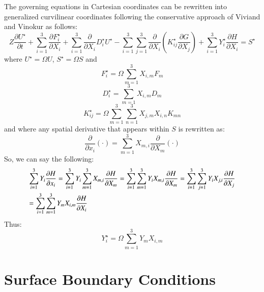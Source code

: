 \documentclass{warpdoc}
\newcommand{\alb}{\vspace{0.1cm}\\} %
\newcommand{\mfd}{\displaystyle}
\begin{document}
The governing equations in Cartesian coordinates can be rewritten into generalized curvilinear coordinates following the conservative approach of Viviand \cite{misc:1974:viviand} and Vinokur \cite{jcp:1974:vinokur} as follows:
%
\begin{equation}
   Z\frac{\partial U^\star}{\partial t} + \sum_{i=1}^3 \frac{\partial F_i^\star}{\partial X_i} 
     + \sum_{i=1}^3 \frac{\partial }{\partial X_i} D_i^\star U^\star
     - \sum_{i=1}^3 \sum_{j=1}^3 \frac{\partial }{\partial X_i}\left( K_{ij}^\star \frac{\partial G}{\partial X_j} \right)
     +\sum_{i=1}^3 Y_i^\star \frac{\partial H}{\partial X_i}  
=
S^\star
\end{equation}
%
where  $U^\star=\Omega U$, $S^\star=\Omega S$ and
%
\begin{equation}
 F_i^\star=\Omega \sum_{m=1}^3 X_{i,m} F_m
\end{equation}
%
%
\begin{equation}
 D_i^\star= \sum_{m=1}^3 X_{i,m} D_m
\end{equation}
%
%
\begin{equation}
 K_{ij}^\star=\Omega \sum_{m=1}^3 \sum_{n=1}^3 X_{j,m} X_{i,n} K_{mn}
\end{equation}
%
and where any spatial derivative that appears within $S$ is rewritten as:
%
\begin{equation}
 \frac{\partial}{\partial x_i}\left( \cdot \right) = \sum_{m=1}^3 X_{m,i} \frac{\partial}{\partial X_m}\left( \cdot \right)
\end{equation}
%
So, we can say the following:
%
\begin{equation}
\begin{array}{l}\mfd
\sum_{i=1}^3 Y_i \frac{\partial H}{\partial x_i}
=
\sum_{i=1}^3 Y_i \sum_{m=1}^3 X_{m,i} \frac{\partial H}{\partial X_m}
=
\sum_{i=1}^3  \sum_{m=1}^3 Y_i X_{m,i} \frac{\partial H}{\partial X_m}
=
\sum_{i=1}^3  \sum_{j=1}^3 Y_i X_{j,i} \frac{\partial H}{\partial X_j}
\alb\mfd=
  \sum_{i=1}^3 \sum_{m=1}^3 Y_m X_{i,m} \frac{\partial H}{\partial X_i}
\end{array}
\end{equation}
%
Thus:
%
\begin{equation}
 Y^\star_i = \Omega \sum_{m=1}^3 Y_m X_{i,m}
\end{equation}
%








\section{Surface Boundary Conditions}
\end{document}
